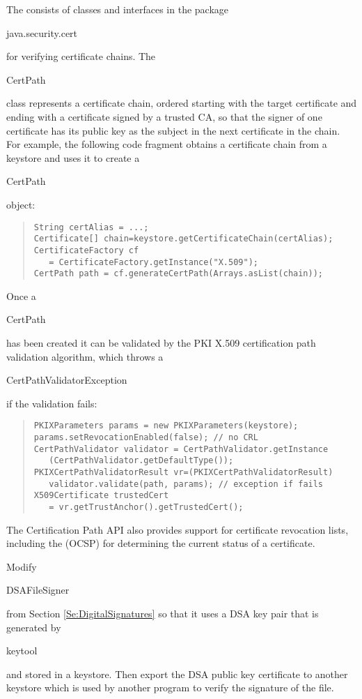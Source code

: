 The  consists of classes and interfaces
in the package \begin{code}java.security.cert\end{code} for verifying certificate chains.
The \begin{code}CertPath\end{code} class represents a certificate chain, ordered
starting with the target certificate and ending with a certificate signed by
a trusted CA, so that the signer of one certificate has its public key as the subject
in the next certificate in the chain.
For example, the following code fragment obtains a certificate chain from a keystore
and uses it to create a \begin{code}CertPath\end{code} object:
\begin{quote}\begin{code}\begin{verbatim}
String certAlias = ...;
Certificate[] chain=keystore.getCertificateChain(certAlias);
CertificateFactory cf
   = CertificateFactory.getInstance("X.509");
CertPath path = cf.generateCertPath(Arrays.asList(chain));
\end{verbatim}\end{code}\end{quote}
Once a \begin{code}CertPath\end{code} has been created it can be
validated by the PKI X.509 certification path validation algorithm, which throws
a \begin{code}CertPathValidatorException\end{code} if the validation fails:
\begin{quote}\begin{code}\begin{verbatim}
PKIXParameters params = new PKIXParameters(keystore);
params.setRevocationEnabled(false); // no CRL
CertPathValidator validator = CertPathValidator.getInstance
   (CertPathValidator.getDefaultType());
PKIXCertPathValidatorResult vr=(PKIXCertPathValidatorResult)
   validator.validate(path, params); // exception if fails
X509Certificate trustedCert
   = vr.getTrustAnchor().getTrustedCert();
\end{verbatim}\end{code}\end{quote}
The Certification Path API also provides support for certificate
revocation lists, including the
 (OCSP) for determining the
current status of a certificate.


\begin{exercise}
Modify \begin{code}DSAFileSigner\end{code} from Section \ref{Se:DigitalSignatures}
so that it uses a DSA key pair that is generated by \begin{code}keytool\end{code}
and stored in a keystore.
Then export the DSA public key certificate to another keystore which is
used by another program to verify the signature of the file.
\end{exercise}
